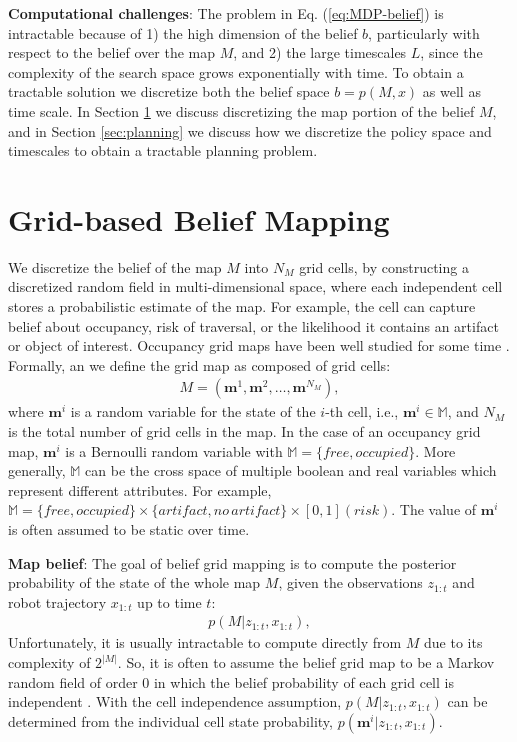 \documentclass{article}
\newcommand{\ph}[1]{{\textbf{#1}:}} %
\newcommand{\todo}[1]{{\color{red} #1 }} %
\begin{document}
\ph{Computational challenges}
The problem in Eq. (\ref{eq:MDP-belief}) is intractable because of 1) the high dimension of the belief $b$, particularly with respect to the belief over the map $M$, and 2) the large timescales $L$, since the complexity of the search space grows exponentially with time.  To obtain a tractable solution we discretize both the belief space $b=p(M,x)$ as well as time scale.  In Section \ref{sec:grid_representation} we discuss discretizing the map portion of the belief $M$, and in Section \ref{sec:planning} we discuss how we discretize the policy space and timescales to obtain a tractable planning problem.

\section{Grid-based Belief Mapping} \label{sec:grid_representation}

We discretize the belief of the map $M$ into $N_M$ grid cells, by constructing a discretized random field in multi-dimensional space, where each independent cell stores a probabilistic estimate of the map.  For example, the cell can capture belief about occupancy, risk of traversal, or the likelihood it contains an artifact or object of interest.  Occupancy grid maps have been well studied for some time \cite{moravec1985high,elfes1990stochastic}.
%
Formally, an we define the grid map as composed of grid cells:
\begin{align}
  M = (\mathbf{m}^1, \mathbf{m}^2, \dots, \mathbf{m}^{N_M}),
\end{align}
where $\mathbf{m}^i$ is a random variable for the state of the $i$-th cell,
i.e., $\mathbf{m}^i \in \mathbb{M}$, and
$N_M$ is the total number of grid cells in the map.
In the case of an occupancy grid map, $\mathbf{m}^i$ is a Bernoulli random variable with $\mathbb{M} = \{free, occupied\}$.  More generally, $\mathbb{M}$ can be the cross space of multiple boolean and real variables which represent different attributes.  For example, $\mathbb{M} = \{free, occupied\}\times\{artifact, no\, artifact\}\times [0,1] (risk)$.
The value of $\mathbf{m}^i$ is often assumed to be static over time.

\ph{Map belief} The goal of belief grid mapping is to compute the posterior probability of the state of the whole map $M$, given the observations $z_{1:t}$ and robot trajectory $x_{1:t}$ up to time $t$:
\begin{align}
  p(M | z_{1:t}, x_{1:t}),
\end{align}
Unfortunately, it is usually intractable to compute directly from $M$ due to its complexity of $2^{|M|}$.
So, it is often to assume the belief grid map to be a Markov random field of order 0 in which the belief probability of each grid cell is independent \cite{TBF05,elfes1990stochastic}.
With the cell independence assumption, $p(M | z_{1:t}, x_{1:t})$ can be determined from the individual cell state probability, $p(\mathbf{m}^i | z_{1:t}, x_{1:t})$.
\end{document}
